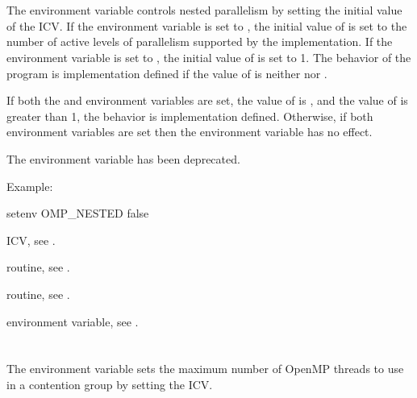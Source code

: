 \section{}
\label{sec:OMP_NESTED}
The  environment variable controls nested parallelism by
setting the initial value of the  ICV. If the
environment variable is set to , the initial value of
 is set to the number of active levels of
parallelism supported by the implementation. If the environment variable is
set to , the initial value of 
is set to 1. The behavior of the program is implementation defined if the
value of  is neither  nor .

If both the  and  environment
variables are set, the value of  is , and
the value of  is greater than 1, the behavior is
implementation defined. Otherwise, if both environment variables are set then
the  environment variable has no effect.

The  environment variable has been deprecated.

Example:
\begin{ompEnv}
setenv OMP_NESTED false
\end{ompEnv}

\begin{crossrefs}
\item {} ICV, see .

\item {} routine, see .

\item {} routine, see .

\item {} environment variable,
see .
\end{crossrefs}



\section{}
\label{sec:OMP_THREAD_LIMIT}
The  environment variable sets the maximum number
of OpenMP threads to use in a contention group by setting the
 ICV.

